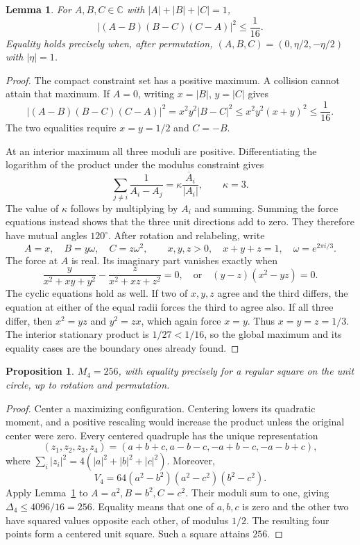 \documentclass[11pt]{article}
\newtheorem{proposition}[theorem]{Proposition}
\newtheorem{lemma}[theorem]{Lemma}
\theoremstyle{remark}
\newcommand{\C}{\mathbb C}
\numberwithin{equation}{section}
\begin{document}
\begin{lemma}\label{lem:l1-three-variational}
For $A,B,C\in\C$ with $|A|+|B|+|C|=1$,
\[
 |(A-B)(B-C)(C-A)|^2\le\frac1{16}.
\]
Equality holds precisely when, after permutation,
$(A,B,C)=(0,\eta/2,-\eta/2)$ with $|\eta|=1$.
\end{lemma}
\begin{proof}
The compact constraint set has a positive maximum. A collision
cannot attain that maximum. If $A=0$, writing $x=|B|$, $y=|C|$
gives
\[
 |(A-B)(B-C)(C-A)|^2
 =x^2y^2|B-C|^2\le x^2y^2(x+y)^2\le\frac1{16}.
\]
The two equalities require $x=y=1/2$ and $C=-B$.

At an interior maximum all three moduli are positive. Differentiating
the logarithm of the product under the modulus constraint gives
\[
 \sum_{j\ne i}\frac1{A_i-A_j}
   =\kappa\frac{\overline A_i}{|A_i|},\qquad \kappa=3.
\]
The value of $\kappa$ follows by multiplying by $A_i$ and summing.
Summing the force equations instead shows that the three unit
directions add to zero. They therefore have mutual angles $120^\circ$.
After rotation and relabeling, write
\[
 A=x,\quad B=y\omega,\quad C=z\omega^2,
 \qquad x,y,z>0,\quad x+y+z=1,
 \quad \omega=e^{2\pi i/3}.
\]
The force at $A$ is real. Its imaginary part vanishes exactly when
\[
 \frac{y}{x^2+xy+y^2}-\frac{z}{x^2+xz+z^2}=0,
 \quad\text{or}\quad (y-z)(x^2-yz)=0.
\]
The cyclic equations hold as well. If two of $x,y,z$ agree and the
third differs, the equation at either of the equal radii forces the
third to agree also. If all three differ, then $x^2=yz$ and
$y^2=zx$, which again force $x=y$. Thus $x=y=z=1/3$.
The interior stationary product is $1/27<1/16$, so the global
maximum and its equality cases are the boundary ones already found.
\end{proof}

\begin{proposition}\label{prop:four-variational-exact}
$M_4=256$, with equality precisely for a regular square on the
unit circle, up to rotation and permutation.
\end{proposition}
\begin{proof}
Center a maximizing configuration. Centering lowers its quadratic
moment, and a positive rescaling would increase the product unless
the original center were zero. Every centered quadruple has the
unique representation
\[
 (z_1,z_2,z_3,z_4)
 =(a+b+c,a-b-c,-a+b-c,-a-b+c),
\]
where $\sum_i|z_i|^2=4(|a|^2+|b|^2+|c|^2)$. Moreover,
\[
 V_4=64(a^2-b^2)(a^2-c^2)(b^2-c^2).
\]
Apply Lemma~\ref{lem:l1-three-variational} to
$A=a^2,B=b^2,C=c^2$. Their moduli sum to one, giving
$\Delta_4\le4096/16=256$. Equality means that one of $a,b,c$ is
zero and the other two have squared values opposite each other,
of modulus $1/2$. The resulting four points form a centered
unit square. Such a square attains $256$.
\end{proof}
\end{document}
